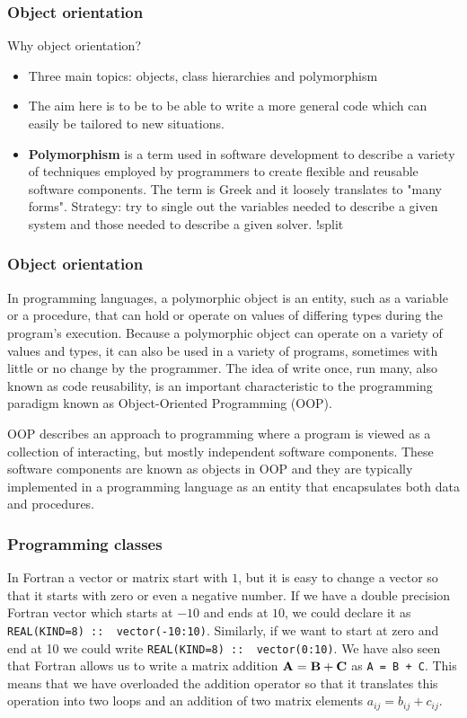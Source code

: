 \documentclass{beamer}
\begin{document}
\begin{frame}
\frametitle{Object orientation}

Why object orientation?

\begin{itemize}
  \item Three main topics: objects, class hierarchies and polymorphism

  \item The aim here is to be to be able to write a more general code which can easily be tailored to new situations.

  \item {\bf Polymorphism} is a term used in software development to describe a variety of techniques employed by programmers to create flexible and reusable software components. The term is Greek and it loosely translates to "many forms". Strategy: try to single out the variables needed to describe a given system and those needed to describe a given solver. !split
\end{itemize}

\noindent
\end{frame}

\begin{frame}
\frametitle{Object orientation}

In programming languages, a polymorphic object is an entity, such as a variable or a procedure, that can hold or operate on values of differing types during the program's execution. Because a polymorphic object can operate on a variety of values and types, it can also be used in a variety of programs, sometimes with little or no change by the programmer. The idea of write once, run many, also known as code reusability, is an important characteristic to the programming paradigm known as Object-Oriented Programming (OOP).

OOP describes an approach to programming where a program is viewed as a collection of interacting, but mostly independent software components. These software components are known as objects in OOP and they are typically implemented in a programming language as an entity that encapsulates both data and procedures.
\end{frame}

\begin{frame}
\frametitle{Programming classes}

In Fortran a vector or matrix start with $1$, but it is easy
to change a vector so that it starts with zero or even a negative number.
If we have a double precision Fortran vector  which starts at $-10$ and ends at $10$, we could declare it as
\Verb!REAL(KIND=8) ::  vector(-10:10)!. Similarly, if we want to start at zero and end at 10 we could write
\Verb!REAL(KIND=8) ::  vector(0:10)!.
We have also seen that Fortran  allows us to write a matrix addition ${\bf A} = {\bf B}+{\bf C}$ as
\Verb!A = B + C!.  This means that we have overloaded the addition operator so that it translates this operation into
two loops and an addition of two matrix elements $a_{ij} = b_{ij}+c_{ij}$.
\end{frame}
\end{document}

